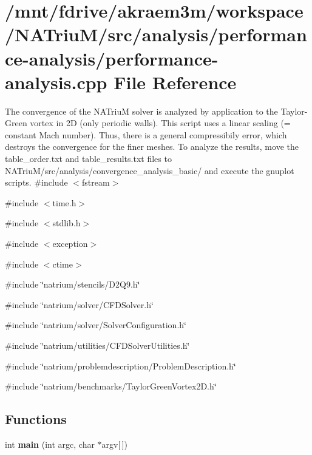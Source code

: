 \hypertarget{performance-analysis_8cpp}{
\section{/mnt/fdrive/akraem3m/workspace/NATriuM/src/analysis/performance-\/analysis/performance-\/analysis.cpp File Reference}
\label{performance-analysis_8cpp}
}


The convergence of the NATriuM solver is analyzed by application to the Taylor-\/Green vortex in 2D (only periodic walls). This script uses a linear scaling (= constant Mach number). Thus, there is a general compressibily error, which destroys the convergence for the finer meshes. To analyze the results, move the table\_\-order.txt and table\_\-results.txt files to NATriuM/src/analysis/convergence\_\-analysis\_\-basic/ and execute the gnuplot scripts.  
{\ttfamily \#include $<$fstream$>$}\par
{\ttfamily \#include $<$time.h$>$}\par
{\ttfamily \#include $<$stdlib.h$>$}\par
{\ttfamily \#include $<$exception$>$}\par
{\ttfamily \#include $<$ctime$>$}\par
{\ttfamily \#include \char`\"{}natrium/stencils/D2Q9.h\char`\"{}}\par
{\ttfamily \#include \char`\"{}natrium/solver/CFDSolver.h\char`\"{}}\par
{\ttfamily \#include \char`\"{}natrium/solver/SolverConfiguration.h\char`\"{}}\par
{\ttfamily \#include \char`\"{}natrium/utilities/CFDSolverUtilities.h\char`\"{}}\par
{\ttfamily \#include \char`\"{}natrium/problemdescription/ProblemDescription.h\char`\"{}}\par
{\ttfamily \#include \char`\"{}natrium/benchmarks/TaylorGreenVortex2D.h\char`\"{}}\par
\subsection*{Functions}
\begin{DoxyCompactItemize}
\item 
\hypertarget{performance-analysis_8cpp_a0ddf1224851353fc92bfbff6f499fa97}{
int {\bfseries main} (int argc, char $\ast$argv\mbox{[}$\,$\mbox{]})}
\label{performance-analysis_8cpp_a0ddf1224851353fc92bfbff6f499fa97}

\end{DoxyCompactItemize}


